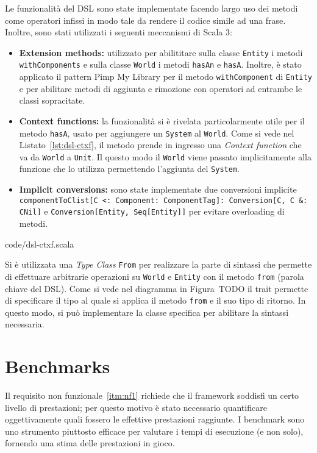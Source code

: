 Le funzionalità del DSL sono state implementate facendo largo uso dei metodi come operatori infissi in modo tale
da rendere il codice simile ad una frase.
Inoltre, sono stati utilizzati i seguenti meccanismi di Scala 3:
\begin{itemize}
    \item \textbf{Extension methods:} utilizzato per abilititare sulla classe \texttt{Entity} i metodi \texttt{withComponents}
    e sulla classe \texttt{World} i metodi \texttt{hasAn} e \texttt{hasA}.
    Inoltre, è stato applicato il pattern Pimp My Library per il metodo \texttt{withComponent} di \texttt{Entity} e per abilitare metodi di aggiunta e rimozione con operatori
    ad entrambe le classi sopracitate.
    \item \textbf{Context functions:} la funzionalità si è rivelata particolarmente utile per il metodo \texttt{hasA}, usato per aggiungere
    un \texttt{System} al \texttt{World}.
    Come si vede nel Listato~\ref{lst:dsl-ctxf}, il metodo prende in ingresso una \textit{Context function} che va da \texttt{World} a \texttt{Unit}.
    Il questo modo il \texttt{World} viene passato implicitamente alla funzione che lo utilizza permettendo l'aggiunta del \texttt{System}.
    \item \textbf{Implicit conversions:} sono state implementate due conversioni implicite \texttt{componentToClist[C <: Component: ComponentTag]: Conversion[C, C &: CNil]}
    e \texttt{Conversion[Entity, Seq[Entity]]} per evitare overloading di metodi.
\end{itemize}


{code/dsl-ctxf.scala}

Si è utilizzata una \textit{Type Class} \texttt{From} per realizzare la parte di sintassi che permette di effettuare arbitrarie operazioni su \texttt{World} e \texttt{Entity}
con il metodo \texttt{from} (parola chiave del DSL).
Come si vede nel diagramma in Figura~TODO il trait permette di specificare il tipo al quale si applica il metodo \texttt{from} e il suo tipo di ritorno.
In questo modo, si può implementare la classe specifica per abilitare la sintassi necessaria.


\section{Benchmarks}\label{sec:benchmarks}
Il requisito non funzionale~\ref{itm:nf1} richiede che il framework soddisfi un certo livello di prestazioni;
per questo motivo è stato necessario quantificare oggettivamente quali fossero le effettive prestazioni raggiunte.
I benchmark sono uno strumento piuttosto efficace per valutare i tempi di esecuzione (e non solo), fornendo
una stima delle prestazioni in gioco.

